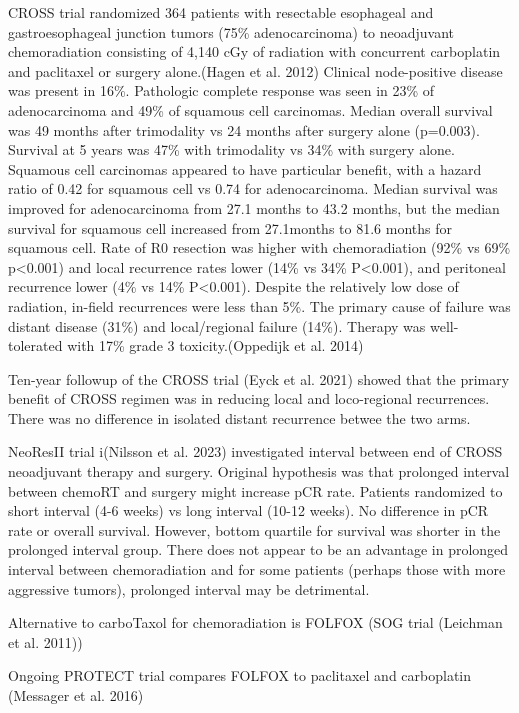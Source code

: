 \documentclass[
  letterpaper,
]{scrbook}
\begin{document}
CROSS trial randomized 364 patients with resectable esophageal and
gastroesophageal junction tumors (75\% adenocarcinoma) to neoadjuvant
chemoradiation consisting of 4,140 cGy of radiation with concurrent
carboplatin and paclitaxel or surgery alone.(Hagen et al. 2012) Clinical
node-positive disease was present in 16\%. Pathologic complete response
was seen in 23\% of adenocarcinoma and 49\% of squamous cell carcinomas.
Median overall survival was 49 months after trimodality vs 24 months
after surgery alone (p=0.003). Survival at 5 years was 47\% with
trimodality vs 34\% with surgery alone. Squamous cell carcinomas
appeared to have particular benefit, with a hazard ratio of 0.42 for
squamous cell vs 0.74 for adenocarcinoma. Median survival was improved
for adenocarcinoma from 27.1 months to 43.2 months, but the median
survival for squamous cell increased from 27.1months to 81.6 months for
squamous cell. Rate of R0 resection was higher with chemoradiation (92\%
vs 69\% p\textless0.001) and local recurrence rates lower (14\% vs 34\%
P\textless0.001), and peritoneal recurrence lower (4\% vs 14\%
P\textless0.001). Despite the relatively low dose of radiation, in-field
recurrences were less than 5\%. The primary cause of failure was distant
disease (31\%) and local/regional failure (14\%). Therapy was
well-tolerated with 17\% grade 3 toxicity.(Oppedijk et al. 2014)

Ten-year followup of the CROSS trial (Eyck et al. 2021) showed that the
primary benefit of CROSS regimen was in reducing local and loco-regional
recurrences. There was no difference in isolated distant recurrence
betwee the two arms.

NeoResII trial i(Nilsson et al. 2023) investigated interval between end
of CROSS neoadjuvant therapy and surgery. Original hypothesis was that
prolonged interval between chemoRT and surgery might increase pCR rate.
Patients randomized to short interval (4-6 weeks) vs long interval
(10-12 weeks). No difference in pCR rate or overall survival. However,
bottom quartile for survival was shorter in the prolonged interval
group. There does not appear to be an advantage in prolonged interval
between chemoradiation and for some patients (perhaps those with more
aggressive tumors), prolonged interval may be detrimental.

Alternative to carboTaxol for chemoradiation is FOLFOX (SOG trial
(Leichman et al. 2011))

Ongoing PROTECT trial compares FOLFOX to paclitaxel and carboplatin
(Messager et al. 2016)
\end{document}
